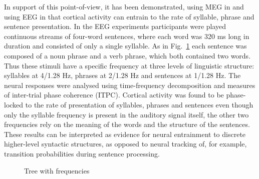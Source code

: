 \documentclass[10pt,letterpaper]{article}
\begin{document}



In support of this point-of-view, it has been demonstrated, using MEG
in \cite{DingEtAl2016} and using EEG in \cite{DingEtAl2017} that
cortical activity can entrain to the rate of syllable, phrase and
sentence presentation. In the EEG experiments participants were played
continuous streams of four-word sentences, where each word was 320 ms
long in duration and consisted of only a single syllable. As in
Fig.~\ref{fig:freq_tree} each sentence was composed of a noun phrase
and a verb phrase, which both contained two words. Thus these stimuli
have a specific frequency at three levels of linguistic structure:
syllables at 4/1.28 Hz, phrases at 2/1.28 Hz and sentences at 1/1.28
Hz. The neural responses were analysed using time-frequency
decomposition and measures of inter-trial phase coherence
(ITPC). Cortical activity was found to be phase-locked to the rate of
presentation of syllables, phrases and sentences even though only the
syllable frequency is present in the auditory signal itself, the other two
frequencies rely on the meaning of the words and the structure of the
sentences.  These results can be interpreted as evidence for neural
entrainment to discrete higher-level syntactic structures, as opposed
to neural tracking of, for example, transition probabilities during
sentence processing.


%
%

\begin{figure}[tb]
\begin{center}
\end{center}
\caption{Tree with frequencies \label{fig:freq_tree}}
\end{figure}
\end{document}
